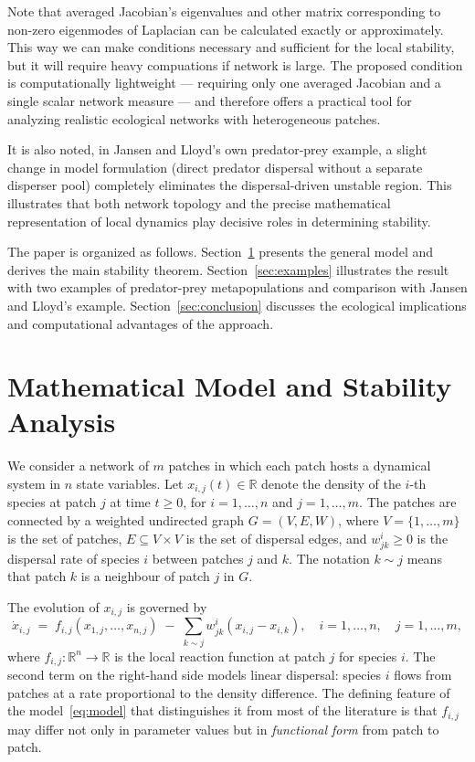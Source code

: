 \documentclass[12pt,a4paper]{article}
\theoremstyle{definition}
\begin{document}
Note that averaged Jacobian's eigenvalues and other matrix corresponding to non-zero eigenmodes of Laplacian can be calculated exactly or approximately. This way we can make conditions necessary and sufficient for the local stability, but it will require heavy compuations if network is large. The proposed condition is computationally lightweight --- requiring only one averaged Jacobian and a single scalar network measure --- and therefore offers a practical tool for analyzing realistic ecological networks with heterogeneous patches.


It is also noted, in Jansen and Lloyd's own predator-prey example, a slight change in model formulation (direct predator dispersal without a separate disperser pool) completely eliminates the dispersal-driven unstable region. This illustrates that both network topology and the precise mathematical representation of local dynamics play decisive roles in determining stability. 

The paper is organized as follows. Section~\ref{sec:stability} presents the general model and derives the main stability theorem. Section~\ref{sec:examples} illustrates the result with two examples of predator-prey metapopulations and comparison with Jansen and Lloyd's example. Section~\ref{sec:conclusion} discusses the ecological implications and computational advantages of the approach.



\section{Mathematical Model and Stability Analysis}
\label{sec:stability}

We consider a network of \(m\) patches in which each patch hosts a dynamical system in \(n\) state variables. Let \(x_{i,j}(t) \in \mathbb{R}\) denote the density  of the \(i\)-th species  at patch \(j\) at time \(t \geq 0\), for \(i = 1,\ldots,n\) and \(j = 1,\ldots,m\). The patches are connected by a weighted undirected graph \(G = (V, E, W)\), where \(V = \{1,\ldots,m\}\) is the set of patches, \(E \subseteq V \times V\) is the set of dispersal edges, and \(w^{i}_{jk} \geq 0\) is the dispersal rate of species \(i\) between patches \(j\) and \(k\). The notation \(k \sim j\) means that patch \(k\) is a neighbour of patch \(j\) in \(G\).

The evolution of \(x_{i,j}\) is governed by
\begin{equation}
  \dot{x}_{i,j}
  \;=\;
  f_{i,j}\!\left(x_{1,j},\ldots,x_{n,j}\right)
  \;-\;
  \sum_{k \sim j} w^{i}_{jk}
    \!\left(x_{i,j} - x_{i,k}\right),
  \quad
  i = 1,\ldots,n,\quad j = 1,\ldots,m,
  \label{eq:model}
\end{equation}
where \(f_{i,j}: \mathbb{R}^n \to \mathbb{R}\) is the local reaction function at patch \(j\) for species \(i\). The second term on the right-hand side models linear dispersal: species \(i\) flows from patches at a rate proportional to the density difference.  The defining feature of the model~\eqref{eq:model} that distinguishes it from most of the literature is that $f_{i,j}$ may differ not only in parameter values but in \emph{functional form} from patch to patch.
\end{document}
